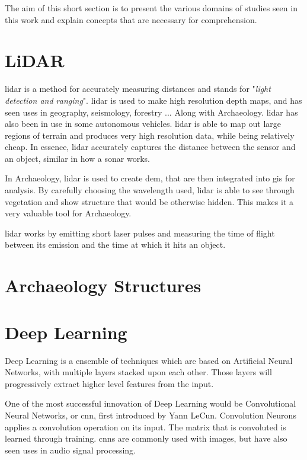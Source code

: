The aim of this short section is to present the various domains of studies seen in this work and explain concepts that are necessary for comprehension. 

\section{LiDAR}
\gls{lidar} is a method for accurately measuring distances and stands for "\textit{light detection and ranging}". \gls{lidar} is used to make high resolution depth maps, and has seen uses in geography, seismology, forestry ... Along with Archaeology. \gls{lidar} has also been in use in some autonomous vehicles. \gls{lidar} is able to map out large regions of terrain and produces very high resolution data, while being relatively cheap. In essence, \gls{lidar} accurately captures the distance between the sensor and an object, similar in how a sonar works. 

In Archaeology, \gls{lidar} is used to create \gls{dem}, that are then integrated into \gls{gis} for analysis. By carefully choosing the wavelength used, \gls{lidar} is able to see through vegetation and show structure that would be otherwise hidden. This makes it a very valuable tool for Archaeology. 

\gls{lidar} works by emitting short laser pulses and measuring the time of flight between its emission and the time at which it hits an object.  

\section{Archaeology Structures}

\section{Deep Learning}\label{overfit}
Deep Learning is a ensemble of techniques which are based on Artificial Neural Networks, with multiple layers stacked upon each other. Those layers will progressively extract higher level features from the input. 

One of the most successful innovation of Deep Learning would be Convolutional Neural Networks, or \gls{cnn}, first introduced by Yann LeCun\cite{lecun98}. Convolution Neurons applies a convolution operation on its input. The matrix that is convoluted is learned through training. \glspl{cnn} are commonly used with images, but have also seen uses in audio signal processing. 

